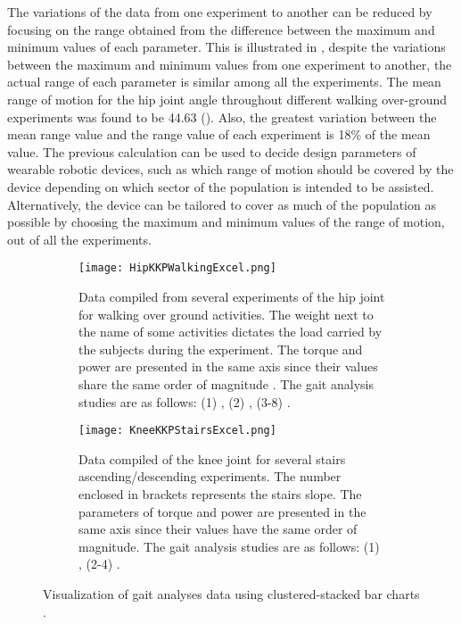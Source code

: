 The variations of the data from one experiment to another can be reduced by focusing on the range obtained from the difference between the maximum and minimum values of each parameter. This is illustrated in , despite the variations between the maximum and minimum values from one experiment to another, the actual range of each parameter is similar among all the experiments. The mean range of motion for the hip joint angle throughout different walking over-ground experiments was found to be 44.63\degree{} (). Also, the greatest variation between the mean range value and the range value of each experiment is 18\% of the mean value. The previous calculation can be used to decide design parameters of wearable robotic devices, such as which range of motion should be covered by the device depending on which sector of the population is intended to be assisted. Alternatively, the device can be tailored to cover as much of the population as possible by choosing the maximum and minimum values of the range of motion, out of all the experiments. 
\begin{figure}[htbp]
    \centering
    \begin{subfigure}[b]{0.75\textwidth}
        \centering
        \texttt{[image: HipKKPWalkingExcel.png]}
        \caption{Data compiled from several experiments of the hip joint for walking over ground activities. The weight next to the name of some activities dictates the load carried by the subjects during the experiment. The torque and power are presented in the same axis since their values share the  same order of magnitude \cite{solis2017characterization}. The gait analysis studies are as follows: (1) \cite{bovi2011multiple}, (2) \cite{lee2008biomechanics}, (3-8) \cite{han2011biomechanical}. }
        \label{fig:HipKKPWalking}
    \end{subfigure}
    \hfill
    \begin{subfigure}[b]{0.75\textwidth}
        \centering
        \texttt{[image: KneeKKPStairsExcel.png]}
        \caption{Data compiled of the knee joint for several stairs ascending/descending experiments. The number enclosed in brackets represents the stairs slope. The parameters of torque and power are presented in the same axis since their values have the same order of magnitude. The gait analysis studies are as follows: (1) \cite{riener2002stair}, (2-4) \cite{reid2007knee}. }
        \label{fig:KneeKKPWalking}
    \end{subfigure}
    \caption{Visualization of gait analyses data using clustered-stacked bar charts \cite{solis2017characterization}. }
    \label{fig:clusteredMain}
\end{figure}

